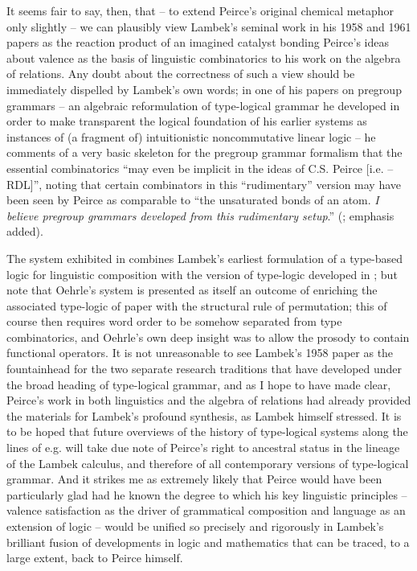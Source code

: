 \documentclass[output=paper,colorlinks,citecolor=brown]{langscibook}
\begin{document}
It seems fair to say, then, that -- to extend Peirce's original
chemical metaphor only slightly -- we can plausibly view Lambek's
seminal work in his 1958 and 1961 papers as the reaction product of an
imagined catalyst bonding Peirce's ideas about valence as the basis of
linguistic combinatorics to his work on the algebra of relations. Any
doubt about the correctness of such a view should be immediately
dispelled by Lambek's own words; in one of his papers on pregroup
grammars -- an algebraic reformulation of type-logical grammar he
developed in order to make transparent the logical foundation of his
earlier systems as instances of (a fragment of) intuitionistic
noncommutative linear logic -- he comments of a very basic skeleton for
the pregroup grammar formalism that the essential combinatorics ``may
even be implicit in the ideas of C.S. Peirce [i.e. \citet{peirce1897}
 -- RDL]'', noting that certain combinators in this ``rudimentary'' version
may have been seen by Peirce as comparable to ``the unsaturated bonds
of an atom. \emph{I believe pregroup grammars developed from this
rudimentary setup}.'' (\citealt[352]{lambek2007a}; emphasis added).

The system exhibited in  combines Lambek's earliest formulation
of a type-based logic for linguistic composition with the version of
type-logic developed in \citet{oehrle1994}; but note that Oehrle's system is
presented as itself an outcome of enriching the associated type-logic
of  paper with the structural rule of permutation; this
of course then requires word order to be somehow separated from type
combinatorics, and Oehrle's own deep insight was to allow the prosody
to contain functional operators. It is not unreasonable to see
Lambek's 1958 paper as the fountainhead for the two separate research
traditions that have developed under the broad heading of type-logical
grammar, and as I hope to have made clear, Peirce's work in both
linguistics and the algebra of relations had already provided the
materials for Lambek's profound synthesis, as Lambek himself stressed.
It is to be hoped that future overviews of the history of type-logical
systems along the lines of e.g. \citet{moortgat2010} will take due note of Peirce's right to
ancestral status in the lineage of the Lambek calculus, and therefore
of all contemporary versions of type-logical grammar. And it strikes
me as extremely likely that Peirce would have been
particularly glad had he known the degree to which his key
linguistic principles -- valence satisfaction as the driver of
grammatical composition and language as an extension of logic -- would
be unified so precisely and rigorously in Lambek's brilliant fusion
of developments in logic and mathematics that can be traced, to a large
extent, back to Peirce himself.
\end{document}
